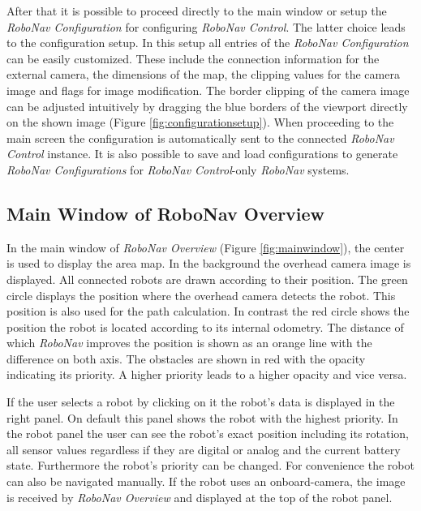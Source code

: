 
After that it is possible to proceed directly to the main window or setup the \textit{RoboNav Configuration} for configuring \textit{RoboNav Control}. The latter choice leads to the configuration setup. In this setup all entries of the \textit{RoboNav Configuration} can be easily customized. These include the connection information for the external camera, the dimensions of the map, the clipping values for the camera image and flags for image modification. The border clipping of the camera image can be adjusted intuitively by dragging the blue borders of the viewport directly on the shown image (Figure \ref{fig:configurationsetup}). When proceeding to the main screen the configuration is automatically sent to the connected \textit{RoboNav Control} instance. It is also possible to save and load configurations to generate \textit{RoboNav Configurations} for \textit{RoboNav Control}-only \textit{RoboNav} systems.


\subsection{Main Window of RoboNav Overview}

In the main window of \textit{RoboNav Overview} (Figure \ref{fig:mainwindow}), the center is used to display the area map. In the background the overhead camera image is displayed. All connected robots are drawn according to their position. The green circle displays the position where the overhead camera detects the robot. This position is also used for the path calculation. In contrast the red circle shows the position the robot is located according to its internal odometry. The distance of which \textit{RoboNav} improves the position is shown as an orange line with the difference on both axis.
The obstacles are shown in red with the opacity indicating its priority. A higher priority leads to a higher opacity and vice versa.

If the user selects a robot by clicking on it the robot's data is displayed in the right panel. On default this panel shows the robot with the highest priority. In the robot panel the user can see the robot's exact position including its rotation, all sensor values regardless if they are digital or analog and the current battery state. Furthermore the robot's priority can be changed. For convenience the robot can also be navigated manually. If the robot uses an onboard-camera, the image is received by \textit{RoboNav Overview} and displayed at the top of the robot panel.

